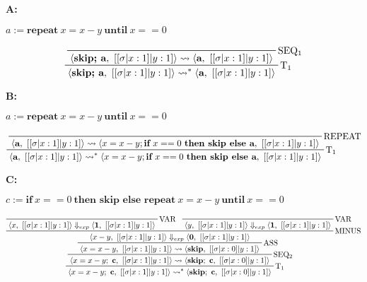 \documentclass[11pt]{article}
\newcommand{\curly}{\mathrel{\leadsto}}
\begin{document}
\textbf{A:}

$a := \textbf{repeat}\ x=x-y\ \textbf{until}\ x==0$

\begin{displaymath}
    \prftree[r]{$\mathrm{T_1}$}{
        \prftree[r]{$\mathrm{SEQ_1}$}
        {\langle \textbf{skip; a},\ [[\sigma|x:1]|y:1] \rangle \curly \langle \textbf{a},\ [[\sigma|x:1]|y:1] \rangle}
    }
    {\langle \textbf{skip; a},\ [[\sigma|x:1]|y:1] \rangle \curly^* \langle \textbf{a},\ [[\sigma|x:1]|y:1] \rangle}
\end{displaymath}

\textbf{B:}

$a:= \textbf{repeat}\ x=x-y\ \textbf{until}\ x==0$

\begin{displaymath}
    \prftree[r]{$\mathrm{T_1}$}{
        \prftree[r]{$\mathrm{REPEAT}$}
        {\langle \textbf{a},\ [[\sigma|x:1]|y:1] \rangle \curly \langle x=x-y; \textbf{if}\ x==0\ \textbf{then\ skip\ else\ a},\ [[\sigma|x:1]|y:1] \rangle}
    }
    {\langle \textbf{a},\ [[\sigma|x:1]|y:1] \rangle \curly^* \langle x=x-y; \textbf{if}\ x==0\ \textbf{then\ skip\ else\ a},\ [[\sigma|x:1]|y:1] \rangle}
\end{displaymath}

\textbf{C:}

$c:= \textbf{if}\ x==0\ \textbf{then\ skip\ else\ repeat}\ x=x-y\ \textbf{until}\ x==0$

\begin{displaymath}
    \prftree[r]{$\mathrm{T_1}$}{
        \prftree[r]{$\mathrm{SEQ_2}$}{
            \prftree[r]{$\mathrm{ASS}$}{
                \prftree[r]{$\mathrm{MINUS}$}{
                    \prftree[r]{$\mathrm{VAR}$}
                    {\langle x,\ [[\sigma|x:1]|y:1] \rangle \Downarrow_{exp} \langle \textbf{1},\ [[\sigma|x:1]|y:1] \rangle}
                }{
                    \prftree[r]{$\mathrm{VAR}$}
                    {\langle y,\ [[\sigma|x:1]|y:1] \rangle \Downarrow_{exp} \langle \textbf{1},\ [[\sigma|x:1]|y:1] \rangle}  
                }
                {\langle x-y,\ [[\sigma|x:1]|y:1] \rangle \Downarrow_{exp} \langle \textbf{0},\ [[\sigma|x:1]|y:1] \rangle}
            }
            {\langle x=x-y,\ [[\sigma|x:1]|y:1] \rangle \curly \langle \textbf{skip},\ [[\sigma|x:0]|y:1] \rangle}
        }
        {\langle x=x-y; \ \textbf{c},\ [[\sigma|x:1]|y:1] \rangle \curly \langle \textbf{skip};\ \textbf{c},\ [[\sigma|x:0]|y:1] \rangle}
    }
    {\langle x=x-y;\ \textbf{c},\ [[\sigma|x:1]|y:1] \rangle \curly^* \langle \textbf{skip};\ \textbf{c},\ [[\sigma|x:0]|y:1] \rangle}
\end{displaymath}
\end{document}
